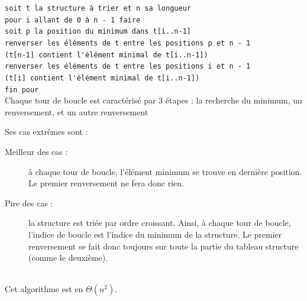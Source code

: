 \verb+soit t la structure à trier et n sa longueur+ \\
\verb+pour i allant de 0 à n - 1 faire+ \\
\verb+soit p la position du minimum dans t[i..n-1]+ \\
\verb+renverser les éléments de t entre les positions p et n - 1+ \\
\verb+(t[n-1] contient l'élément minimal de t[i..n-1])+ \\
\verb+renverser les éléments de t entre les positions i et n - 1+ \\
\verb+(t[i] contient l'élément minimal de t[i..n-1])+ \\
\verb+fin pour+ \\

Chaque tour de boucle est caractérisé par 3 étapes : la recherche du minimum, un renversement, et un autre renversement

Ses cas extrêmes sont :
\begin{description}
	\item[Meilleur des cas :] à chaque tour de boucle, l'élément minimum se trouve en dernière position. Le premier renversement ne fera donc rien.
	\item[Pire des cas :] la structure est triée par ordre croissant. Ainsi, à chaque tour de boucle, l'indice de boucle est l'indice du minimum de la structure. Le premier renversement se fait donc toujours sur toute la partie du tableau structure (comme le deuxième).
\end{description}
~\\
Cet algorithme est en $\Theta(n^2)$.
~\\

